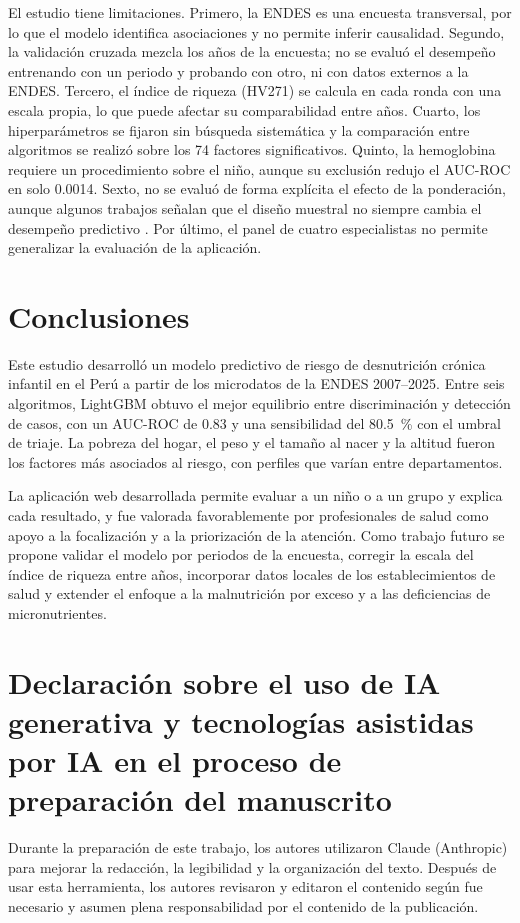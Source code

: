 \documentclass[final,5p,times,twocolumn,number,lefttitle]{elsarticle}
\begin{document}
El estudio tiene limitaciones. Primero, la ENDES es una encuesta transversal, por lo que el modelo identifica asociaciones y no permite inferir causalidad. Segundo, la validación cruzada mezcla los años de la encuesta; no se evaluó el desempeño entrenando con un periodo y probando con otro, ni con datos externos a la ENDES. Tercero, el índice de riqueza (HV271) se calcula en cada ronda con una escala propia, lo que puede afectar su comparabilidad entre años. Cuarto, los hiperparámetros se fijaron sin búsqueda sistemática y la comparación entre algoritmos se realizó sobre los 74 factores significativos. Quinto, la hemoglobina requiere un procedimiento sobre el niño, aunque su exclusión redujo el AUC-ROC en solo 0.0014. Sexto, no se evaluó de forma explícita el efecto de la ponderación, aunque algunos trabajos señalan que el diseño muestral no siempre cambia el desempeño predictivo \citep{si2025sampling}. Por último, el panel de cuatro especialistas no permite generalizar la evaluación de la aplicación.

\section{Conclusiones}

Este estudio desarrolló un modelo predictivo de riesgo de desnutrición crónica infantil en el Perú a partir de los microdatos de la ENDES 2007--2025. Entre seis algoritmos, LightGBM obtuvo el mejor equilibrio entre discriminación y detección de casos, con un AUC-ROC de 0.83 y una sensibilidad del 80.5~\% con el umbral de triaje. La pobreza del hogar, el peso y el tamaño al nacer y la altitud fueron los factores más asociados al riesgo, con perfiles que varían entre departamentos.

La aplicación web desarrollada permite evaluar a un niño o a un grupo y explica cada resultado, y fue valorada favorablemente por profesionales de salud como apoyo a la focalización y a la priorización de la atención. Como trabajo futuro se propone validar el modelo por periodos de la encuesta, corregir la escala del índice de riqueza entre años, incorporar datos locales de los establecimientos de salud y extender el enfoque a la malnutrición por exceso y a las deficiencias de micronutrientes.

\FloatBarrier
\section*{Declaración sobre el uso de IA generativa y tecnologías asistidas por IA en el proceso de preparación del manuscrito}
Durante la preparación de este trabajo, los autores utilizaron Claude (Anthropic) para mejorar la redacción, la legibilidad y la organización del texto. Después de usar esta herramienta, los autores revisaron y editaron el contenido según fue necesario y asumen plena responsabilidad por el contenido de la publicación.
\end{document}
